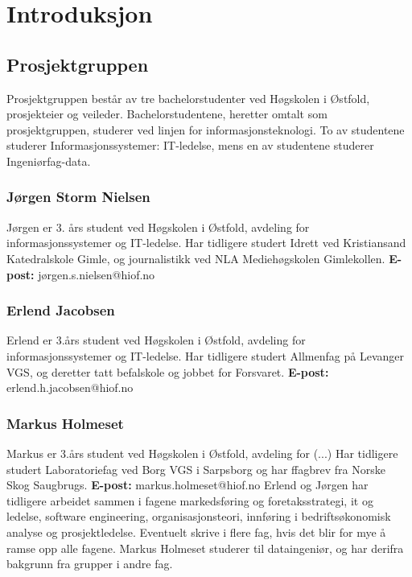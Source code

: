 \cleardoublepage
\chapter{Introduksjon}
\label{chap:intro}


\section{Prosjektgruppen}


Prosjektgruppen består av tre bachelorstudenter ved Høgskolen i Østfold, prosjekteier og veileder. 
Bachelorstudentene, heretter omtalt som prosjektgruppen, studerer ved linjen for informasjonsteknologi. To av studentene studerer Informasjonssystemer: IT-ledelse, mens en av studentene studerer Ingeniørfag-data. 

\subsection{Jørgen Storm Nielsen}

Jørgen er 3. års student ved Høgskolen i Østfold, avdeling for informasjonssystemer og IT-ledelse.
Har tidligere studert Idrett ved Kristiansand Katedralskole Gimle, og journalistikk ved NLA Mediehøgskolen Gimlekollen. \newline
\textbf{E-post:} jørgen.s.nielsen@hiof.no

\subsection{Erlend Jacobsen}

Erlend er 3.års student ved Høgskolen i Østfold, avdeling for informasjonssystemer og IT-ledelse.
Har tidligere studert Allmenfag på Levanger VGS, og deretter tatt befalskole og jobbet for Forsvaret. \newline
\textbf{E-post:} erlend.h.jacobsen@hiof.no

\subsection{Markus Holmeset}
Markus er 3.års student ved Høgskolen i Østfold, avdeling for (...)
Har tidligere studert Laboratoriefag ved Borg VGS i Sarpsborg og har ffagbrev fra Norske Skog Saugbrugs.\newline
\textbf{E-post:} markus.holmeset@hiof.no\newline
Erlend og Jørgen har tidligere arbeidet sammen i fagene markedsføring og foretaksstrategi,  it og ledelse, software engineering, organisasjonsteori, innføring i bedriftsøkonomisk analyse og prosjektledelse. {\color {red} Eventuelt skrive i flere fag, hvis det blir for mye å ramse opp alle fagene.}
Markus Holmeset studerer til dataingeniør, og har derifra bakgrunn fra grupper i andre fag.



